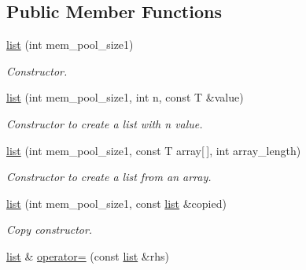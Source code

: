\subsection*{Public Member Functions}
\begin{DoxyCompactItemize}
\item 
\hypertarget{classofeli_1_1list_a39932b3048b4ddbac43b00e7bad6a9da}{\hyperlink{classofeli_1_1list_a39932b3048b4ddbac43b00e7bad6a9da}{list} (int mem\-\_\-pool\-\_\-size1)}\label{classofeli_1_1list_a39932b3048b4ddbac43b00e7bad6a9da}

\begin{DoxyCompactList}\small\item\em Constructor. \end{DoxyCompactList}\item 
\hypertarget{classofeli_1_1list_add13c528e17c77a568aea94adec5db71}{\hyperlink{classofeli_1_1list_add13c528e17c77a568aea94adec5db71}{list} (int mem\-\_\-pool\-\_\-size1, int n, const T \&value)}\label{classofeli_1_1list_add13c528e17c77a568aea94adec5db71}

\begin{DoxyCompactList}\small\item\em Constructor to create a list with {\itshape n} value. \end{DoxyCompactList}\item 
\hypertarget{classofeli_1_1list_ac02bf0a0e738893734778313def2b557}{\hyperlink{classofeli_1_1list_ac02bf0a0e738893734778313def2b557}{list} (int mem\-\_\-pool\-\_\-size1, const T array\mbox{[}$\,$\mbox{]}, int array\-\_\-length)}\label{classofeli_1_1list_ac02bf0a0e738893734778313def2b557}

\begin{DoxyCompactList}\small\item\em Constructor to create a list from an array. \end{DoxyCompactList}\item 
\hypertarget{classofeli_1_1list_a6634b04ef70d4a4a11af6974e0b2b685}{\hyperlink{classofeli_1_1list_a6634b04ef70d4a4a11af6974e0b2b685}{list} (int mem\-\_\-pool\-\_\-size1, const \hyperlink{classofeli_1_1list}{list} \&copied)}\label{classofeli_1_1list_a6634b04ef70d4a4a11af6974e0b2b685}

\begin{DoxyCompactList}\small\item\em Copy constructor. \end{DoxyCompactList}\item 
\hypertarget{classofeli_1_1list_a0093d68c35e21c0b52c12a371be58826}{\hyperlink{classofeli_1_1list}{list} \& \hyperlink{classofeli_1_1list_a0093d68c35e21c0b52c12a371be58826}{operator=} (const \hyperlink{classofeli_1_1list}{list} \&rhs)}\label{classofeli_1_1list_a0093d68c35e21c0b52c12a371be58826}


\end{DoxyCompactItemize}
